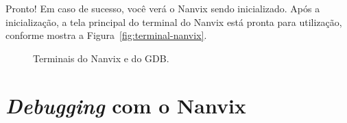 \documentclass[11pt]{article}
\begin{document}
Pronto! Em caso de sucesso, você verá o Nanvix sendo inicializado. Após a inicialização, a tela principal do terminal do Nanvix está pronta para utilização, conforme mostra a Figura~\ref{fig:terminal-nanvix}.

\begin{figure}[t]
	\centering
	\qquad
\caption{Terminais do Nanvix e do GDB.}
\end{figure}

\section{\textit{Debugging} com o Nanvix}
\end{document}
